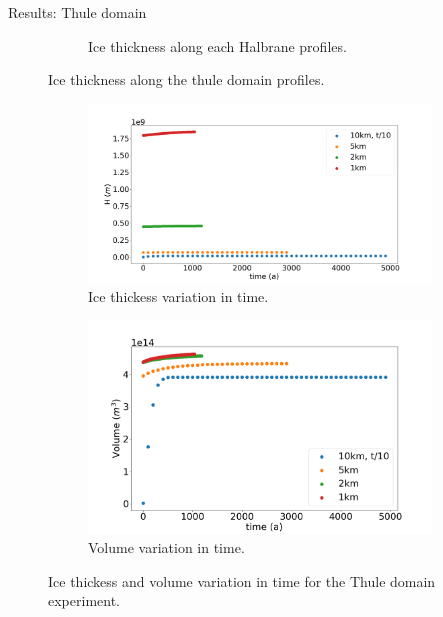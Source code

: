 \documentclass[11pt]{beamer}
\begin{document}
\begin{frame}[allowframebreaks]{Results: Thule domain}
\begin{figure}
\begin{subfigure}{.5\textwidth}
					\caption{Ice thickness along each Halbrane profiles.}
					\label{Halbranes_thule}
				\end{subfigure}
				\caption{Ice thickness along the thule domain profiles.}
				\label{Thule_profiles_capronas_and_halbranes}
			\end{figure}
			\begin{figure}
				\centering
				\begin{subfigure}{.5\textwidth}
					\centering
					\includegraphics[width=1.1\linewidth]{../fig/H_THULE_full_all_res_vs_time.png}
					\caption{Ice thickess variation in time.}
					\label{H_THULE_VS_TIME}
				\end{subfigure}%
				\begin{subfigure}{.5\textwidth}
					\centering
					\includegraphics[width=1.1\linewidth]{../fig/Volume_THULE_full_all_res_vs_time.png}
					\caption{Volume variation in time.}
					\label{VOLUME_THULE_VS_TIME}
				\end{subfigure}
				\caption{Ice thickess and volume variation in time for the Thule domain experiment.}
				\label{H_THULE_VS_TIME_VS_NODES}
			\end{figure}

\end{frame}
\end{document}
